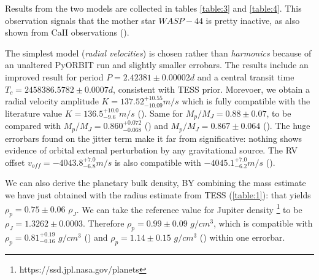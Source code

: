 \documentclass{aa}
\begin{document}
Results from the two models are collected in tables \ref{table:3} and \ref{table:4}. This observation signals that the mother star $WASP-44$ is pretty inactive, as also shown from CaII observations (\cite{Turner}). 

The simplest model (\textit{radial velocities}) is chosen rather than \textit{harmonics}
because of an unaltered PyORBIT run and slightly smaller errobars. 
The results include an improved result for period $P=2.42381\pm0.00002d$ 
and a central transit time $T_c=2458386.5782\pm0.0007d$, consistent with TESS prior.
Morevoer, we obtain a radial velocity amplitude $K=137.52^{+10.55}_{-10.09}m/s$
which is fully compatible with the literature value $K=136.5^{+10.0}_{-9.6}m/s$ (\cite{Addison}).
Same for $M_p/M_J = 0.88\pm0.07$, to be compared with  $M_p/M_J=0.860^{+0.072}_{-0.068}$ (\cite{Addison}) and $M_p/M_J=0.867\pm0.064$ (\cite{Turner}).
The huge errorbars found on the jitter term make it far from significative: nothing shows evidence of orbital external perturbation by any gravitational source. The RV offset $v_{off}=-4043.8^{+7.0}_{-6.8}m/s$ is also compatible with $-4045.1^{+7.0}_{-6.2}m/s$ (\cite{Addison}).

We can also derive the planetary bulk  density, BY combining the mass estimate we have just obtained with the radius estimate from TESS (\ref{table:1}): that yields $\rho_p = 0.75\pm0.06$ $\rho_J$. We can take the reference value for Jupiter density \footnote{https://ssd.jpl.nasa.gov/planets}
to be $\rho_J = 1.3262\pm 0.0003 $. Therefore $\rho_p =0.99\pm0.09$ $g/cm^3$, which is compatible with $\rho_p = 0.81^{+0.19}_{-0.16}$ $g/cm^3$ (\cite{Addison}) and $\rho_p = 1.14\pm 0.15$ $g/cm^3$ (\cite{Turner}) within one errorbar. 
\end{document}
